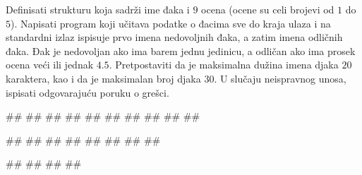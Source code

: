 \begin{Exercise}[label=struc.14]
Definisati strukturu  koja sadrži ime đaka i $9$ ocena (ocene su celi brojevi od $1$ do
$5$). Napisati program koji učitava podatke o đacima sve do kraja ulaza
i na standardni izlaz ispisuje prvo imena nedovoljnih đaka, a zatim imena
odličnih đaka. Đak je nedovoljan ako ima barem jednu jedinicu, a 
odličan ako ima prosek ocena veći ili jednak $4.5$.
Pretpostaviti da je maksimalna dužina imena djaka $20$ karaktera, kao i da
je maksimalan broj djaka $30$.
U slučaju neispravnog unosa, ispisati odgovarajuću poruku o grešci.

\begin{maxitest}
\begin{upotreba}{1}
#\naslovInt#
##
##
##
##
##
##
#\izlaz{\ }#
##
##
\end{upotreba}
\end{maxitest}

\begin{maxitest}
\begin{upotreba}{2}
#\naslovInt#
##
##
##
##
#\izlaz{\ }#
##
##
\end{upotreba}
\end{maxitest}

\begin{maxitest}
\begin{upotreba}{3}
#\naslovInt#
##
##
##
\end{upotreba}
\end{maxitest}

\end{Exercise}
\ifresenja
\begin{Answer}[ref=struc.14]
\end{Answer}
\fi


